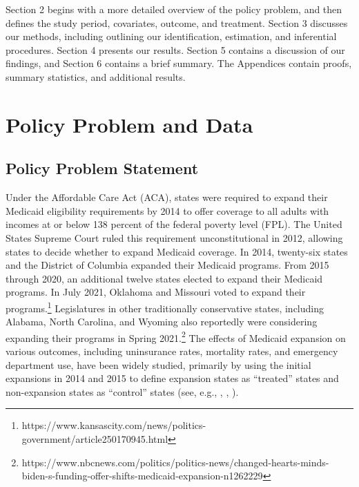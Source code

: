 \documentclass[aoas]{imsart}
\theoremstyle{plain}
\theoremstyle{remark}
\begin{document}
Section 2 begins with a more detailed overview of the policy problem, and then defines the study period, covariates, outcome, and treatment. Section 3 discusses our methods, including outlining our identification, estimation, and inferential procedures. Section 4 presents our results. Section 5 contains a discussion of our findings, and Section 6 contains a brief summary. The Appendices contain proofs, summary statistics, and additional results.

\section{Policy Problem and Data}

\subsection{Policy Problem Statement}

Under the Affordable Care Act (ACA), states were required to expand their Medicaid eligibility requirements by 2014 to offer coverage to all adults with incomes at or below 138 percent of the federal poverty level (FPL). The United States Supreme Court ruled this requirement unconstitutional in 2012, allowing states to decide whether to expand Medicaid coverage. In 2014, twenty-six states and the District of Columbia expanded their Medicaid programs. From 2015 through 2020, an additional twelve states elected to expand their Medicaid programs. In July 2021, Oklahoma and Missouri voted to expand their programs.\footnote{https://www.kansascity.com/news/politics-government/article250170945.html} Legislatures in other traditionally conservative states, including Alabama, North Carolina, and Wyoming also reportedly were considering expanding their programs in Spring 2021.\footnote{https://www.nbcnews.com/politics/politics-news/changed-hearts-minds-biden-s-funding-offer-shifts-medicaid-expansion-n1262229} The effects of Medicaid expansion on various outcomes, including uninsurance rates, mortality rates, and emergency department use, have been widely studied, primarily by using the initial expansions in 2014 and 2015 to define expansion states as ``treated'' states and non-expansion states as ``control'' states (see, e.g., \cite{courtemanche2017early}, \cite{wherry2016early}, \cite{ladhania2021effect}).
\end{document}

